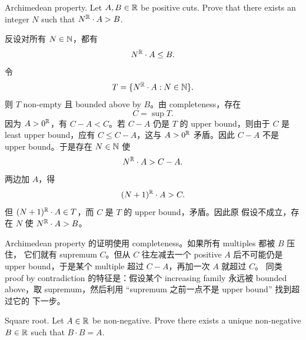 \begin{exerciseblock}
Archimedean property. Let \(A,B\in\mathbb{R}\) be positive cuts. Prove that there exists
an integer \(N\) such that \(N^{\mathbb{R}}\cdot A>B\).
\end{exerciseblock}

\begin{solution}
反设对所有 \(N\in\mathbb{N}\)，都有
\[
  N^{\mathbb{R}}\cdot A\leq B.
\]
令
\[
  T=\{N^{\mathbb{R}}\cdot A:N\in\mathbb{N}\}.
\]
则 \(T\) non-empty 且 bounded above by \(B\)。由 completeness，存在
\[
  C=\sup T.
\]
因为 \(A>0^{\mathbb{R}}\)，有 \(C-A<C\)。若 \(C-A\) 仍是 \(T\) 的 upper bound，则由于
\(C\) 是 least upper bound，应有 \(C\leq C-A\)，这与 \(A>0^{\mathbb{R}}\) 矛盾。因此
\(C-A\) 不是 upper bound。于是存在 \(N\in\mathbb{N}\) 使
\[
  N^{\mathbb{R}}\cdot A>C-A.
\]
两边加 \(A\)，得
\[
  (N+1)^{\mathbb{R}}\cdot A>C.
\]
但 \((N+1)^{\mathbb{R}}\cdot A\in T\)，而 \(C\) 是 \(T\) 的 upper bound，矛盾。因此原
假设不成立，存在 \(N\) 使 \(N^{\mathbb{R}}\cdot A>B\)。
\end{solution}

\begin{explanation}
Archimedean property 的证明使用 completeness。如果所有 multiples 都被 \(B\) 压住，
它们就有 supremum \(C\)。但从 \(C\) 往左减去一个 positive \(A\) 后不可能仍是
upper bound，于是某个 multiple 超过 \(C-A\)，再加一次 \(A\) 就超过 \(C\)。
同类 proof by contradiction 的特征是：假设某个 increasing family 永远被 bounded
above，取 supremum，然后利用 ``supremum 之前一点不是 upper bound'' 找到超过它的
下一步。
\end{explanation}

\begin{exerciseblock}
Square root. Let \(A\in\mathbb{R}\) be non-negative. Prove there exists a unique
non-negative \(B\in\mathbb{R}\) such that \(B\cdot B=A\).
\end{exerciseblock}

